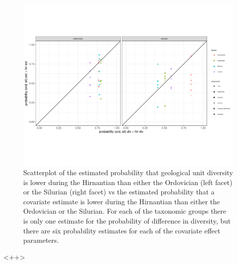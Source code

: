 \documentclass[12pt,letterpaper]{article}
\begin{document}







\begin{figure}[ht]
  \centering
  \includegraphics[width=\textwidth,height=0.5\textheight,keepaspectratio=true]{figure/compare_pval}
  \caption{Scatterplot of the estimated probability that geological unit diversity is lower during the Hirnantian than either the Ordovician (left facet) or the Silurian (right facet) vs the estimated probability that a covariate estimate is lower during the Hirnantian than either the Ordovician or the Silurian. For each of the taxonomic groups there is only one estimate for the probability of difference in diversity, but there are six probability estimates for each of the covariate effect parameters. }
  \label{fig:<+label+>}
\end{figure}<++>
\end{document}
